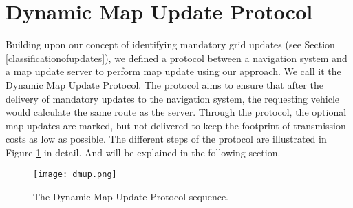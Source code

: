 \section{Dynamic Map Update Protocol}\label{protocol}
Building upon our concept of identifying mandatory grid updates (see Section \ref{classificationofupdates}), we defined a protocol between a navigation system and a map update server to perform map update using our approach. We call it the Dynamic Map Update Protocol. The protocol aims to ensure that after the delivery of mandatory updates to the navigation system, the requesting vehicle would calculate the same route as the server. Through the protocol, the optional map updates are marked, but not delivered to keep the footprint of transmission costs as low as possible. The different steps of the protocol are illustrated in Figure \ref{fg:protocol} in detail. And will be explained in the following section.


\begin{figure}
\centering
\texttt{[image: dmup.png]}
\caption{The Dynamic Map Update Protocol sequence.}
\label{fg:protocol}
\end{figure}



